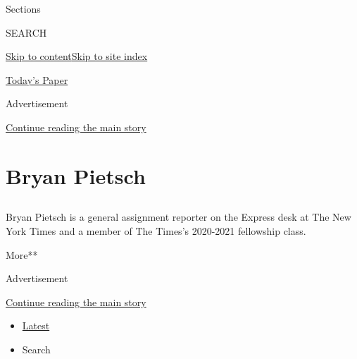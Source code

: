 Sections

SEARCH

\protect\hyperlink{site-content}{Skip to
content}\protect\hyperlink{site-index}{Skip to site index}

\href{https://myaccount.nytimes3xbfgragh.onion/auth/login?response_type=cookie\&client_id=vi}{}

\href{https://www.nytimes3xbfgragh.onion/section/todayspaper}{Today's
Paper}

Advertisement

\protect\hyperlink{after-top}{Continue reading the main story}

\hypertarget{bryan-pietsch}{%
\section{Bryan Pietsch}\label{bryan-pietsch}}

\subsection{}

Bryan Pietsch is a general assignment reporter on the Express desk at
The New York Times and a member of The Times's 2020-2021 fellowship
class.

More**

Advertisement

\protect\hyperlink{after-mid1}{Continue reading the main story}

\begin{itemize}
\tightlist
\item
  \protect\hyperlink{stream-panel}{Latest}
\item
  Search
\end{itemize}

